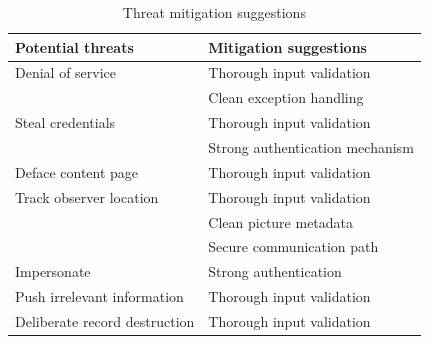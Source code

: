 \begin{table}[htb]
	\centering
    \begin{tabular}{| l | l |}
		\hline
		Potential threats & Mitigation suggestions \\
		\hline \hline
		Denial of service	& Thorough input validation \\& Clean exception handling \\
		Steal credentials	& Thorough input validation\\	& Strong authentication mechanism \\
        Deface content page & Thorough input validation\\
        Track observer location & Thorough input validation\\ & Clean picture metadata\\ & Secure communication path\\
        Impersonate & Strong authentication\\
        Push irrelevant information & Thorough input validation\\
        Deliberate record destruction & Thorough input validation\\
        
		\hline
    \end{tabular}
  \caption{Threat mitigation suggestions}
\end{table}
